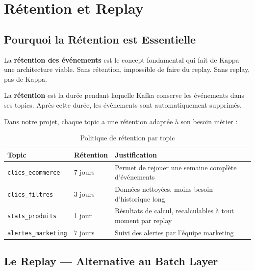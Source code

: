 \chapter{Rétention et Replay}

\section{Pourquoi la Rétention est Essentielle}

La \textbf{rétention des événements} est le concept fondamental qui fait de Kappa une architecture viable. Sans rétention, impossible de faire du replay. Sans replay, pas de Kappa.

\begin{infobox}
    \centering
    \vspace{0.3cm}
    {\large La \textbf{rétention} est la durée pendant laquelle Kafka conserve les événements dans ses topics. Après cette durée, les événements sont automatiquement supprimés.}
    \vspace{0.3cm}
\end{infobox}

Dans notre projet, chaque topic a une rétention adaptée à son besoin métier :

\begin{table}[H]
\centering
\begin{tabularx}{\textwidth}{L{3.5cm} C{2cm} X}
\toprule
\textbf{\color{primarycolor}Topic} &
\textbf{\color{primarycolor}Rétention} &
\textbf{\color{primarycolor}Justification} \\
\midrule
\texttt{clics\_ecommerce} & 7 jours & Permet de rejouer une semaine complète d'événements \\
\addlinespace[0.1cm]
\texttt{clics\_filtres} & 3 jours & Données nettoyées, moins besoin d'historique long \\
\addlinespace[0.1cm]
\texttt{stats\_produits} & 1 jour & Résultats de calcul, recalculables à tout moment par replay \\
\addlinespace[0.1cm]
\texttt{alertes\_marketing} & 7 jours & Suivi des alertes par l'équipe marketing \\
\bottomrule
\end{tabularx}
\caption{Politique de rétention par topic}
\end{table}

\section{Le Replay --- Alternative au Batch Layer}

